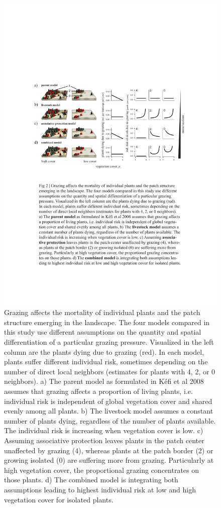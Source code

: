 \begin{figure}[tp]
	\centering
		\includegraphics{figures/fig2.pdf}
	\caption{Grazing affects the mortality of individual plants and the patch structure emerging in the landscape. The four models compared in this study use different assumptions on the quantity and spatial differentiation of a particular grazing pressure. Visualized in the left column are the plants dying due to grazing (red). In each model, plants suffer different individual risk, sometimes depending on the number of direct local neighbors (estimates for plants with 4, 2, or 0 neighbors).  a) The parent model as formulated in Kéfi et al 2008 assumes that grazing affects a proportion of living plants, i.e. individual risk is independent of global vegetation cover and shared evenly among all plants. b) The livestock model assumes a constant number of plants dying, regardless of the number of plants available. The individual risk is increasing when vegetation cover is low. c) Assuming asso­cia­tive protection leaves plants in the patch center unaffected by grazing (4), where­as plants at the patch border (2) or growing isolated (0) are suffering more from grazing. Particularly at high vegetation cover, the proportional grazing concentrates on those plants. d) The combined model is integrating both assumptions leading to highest individual risk at low and high vegetation cover for isolated plants.  }
	\label{fig:fig1}
\end{figure}

